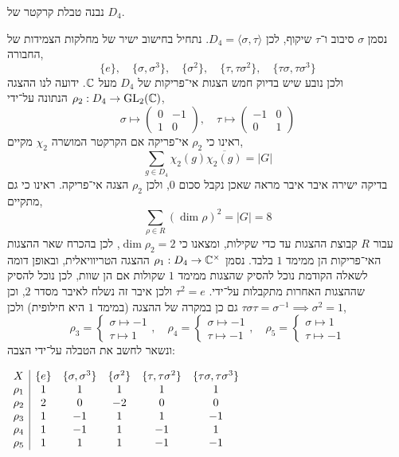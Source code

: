 \question{}
\subquestion{}
נבנה טבלת קרקטר של $D_4$.
\begin{solution}
	נסמן $\sigma$ סיבוב ו־$\tau$ שיקוף, לכן $D_4 = \langle \sigma, \tau \rangle$.
	נתחיל בחישוב ישיר של מחלקות הצמידות של החבורה,
	\[
		\{ e \},
		\quad
		\{ \sigma, \sigma^3 \},
		\quad
		\{ \sigma^2 \},
		\quad
		\{ \tau, \tau \sigma^2 \},
		\quad
		\{ \tau \sigma, \tau \sigma^3 \}
	\]
	ולכן נובע שיש בדיוק חמש הצגות אי־פריקות של $D_4$ מעל $\mathbb{C}$.
	ידועה לנו ההצגה $\rho_2 : D_4 \to \operatorname{GL}_2(\mathbb{C})$ הנתונה על־ידי,
	\[
		\sigma
		\mapsto \begin{pmatrix}
			0 & -1 \\
			1 & 0
		\end{pmatrix},
		\quad
		\tau
		\mapsto \begin{pmatrix}
			-1 & 0 \\
			0 & 1
		\end{pmatrix}
	\]
	ראינו כי $\rho_2$ אי־פריקה אם הקרקטר המושרה $\chi_2$ מקיים,
	\[
		\sum_{g \in D_4} \chi_2(g) \overline{\chi_2(g)}
		= |G|
	\]
	בדיקה ישירה איבר איבר מראה שאכן נקבל סכום $0$, ולכן $\rho_2$ הצגה אי־פריקה.
	ראינו כי גם מתקיים,
	\[
		\sum_{\rho \in R} {(\dim \rho)}^2
		= |G|
		= 8
	\]
	עבור $R$ קבוצת ההצגות עד כדי שקילות, ומצאנו כי $\dim \rho_2 = 2$, לכן בהכרח שאר ההצגות האי־פריקות הן ממימד $1$ בלבד.
	נסמן $\rho_1 : D_4 \to \mathbb{C}^\times$ ההצגה הטריוויאלית,
	ובאופן דומה לשאלה הקודמת נוכל להסיק שהצגות ממימד $1$ שקולות אם הן שוות, לכן נוכל להסיק שההצגות האחרות מתקבלות על־ידי.
	$\tau^2 = e$ ולכן איבר זה נשלח לאיבר מסדר $2$, וכן $\tau \sigma \tau = \sigma^{-1} \implies \sigma^2 = 1$ גם כן במקרה של ההצגה (במימד $1$ היא חילופית) ולכן,
	\[
		\rho_3
		= \begin{cases}
			\sigma \mapsto -1 \\
			\tau \mapsto 1
		\end{cases},
		\quad
		\rho_4
		= \begin{cases}
			\sigma \mapsto -1 \\
			\tau \mapsto -1
		\end{cases},
		\quad
		\rho_5
		= \begin{cases}
			\sigma \mapsto 1 \\
			\tau \mapsto -1
		\end{cases}
	\]
	ונשאר לחשב את הטבלה על־ידי הצבה:
	\begin{otherlanguage}{english}
		\begin{center}
			$\begin{array}{c | c c c c c}
				X & \{ e \} & \{ \sigma, \sigma^3 \} & \{ \sigma^2 \} & \{ \tau, \tau \sigma^2 \} & \{ \tau \sigma, \tau \sigma^3 \} \\
				\rho_1 & 1 & 1 & 1 & 1 & 1 \\
				\rho_2 & 2 & 0 & -2 & 0 & 0 \\
				\rho_3 & 1 & -1 & 1 & 1 & -1 \\
				\rho_4 & 1 & -1 & 1 & -1 & 1 \\
				\rho_5 & 1 & 1 & 1 & -1 & -1
			\end{array}$
		\end{center}
	\end{otherlanguage}
\end{solution}

